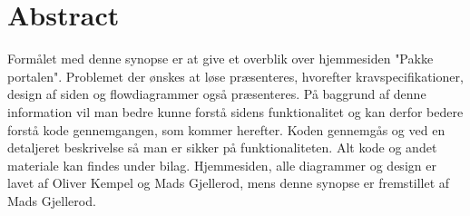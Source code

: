 \section*{Abstract}

\vspace{7mm}
{\Large
Formålet med denne synopse er at give et overblik over
hjemmesiden "Pakke portalen". Problemet der
ønskes at løse præsenteres, hvorefter kravspecifikationer, design af siden og
flowdiagrammer også præsenteres. På baggrund af denne information vil man bedre kunne
forstå sidens funktionalitet og kan derfor bedere forstå kode gennemgangen, som kommer
herefter. Koden gennemgås og ved en detaljeret beskrivelse så man er sikker på
funktionaliteten. Alt kode og andet materiale kan findes under bilag. Hjemmesiden, alle
diagrammer og design er lavet af Oliver Kempel og Mads Gjellerod, mens denne synopse er
fremstillet af Mads Gjellerod.

}

\vspace{15mm}
